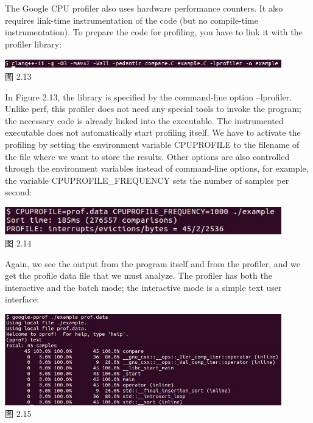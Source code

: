 
The Google CPU profiler also uses hardware performance counters. It also requires link-time instrumentation of the code (but no compile-time instrumentation). To prepare the code for profiling, you have to link it with the profiler library:

\begin{center}
\includegraphics[width=0.9\textwidth]{content/1/chapter2/images/13.jpg}\\
图 2.13
\end{center}

In Figure 2.13, the library is specified by the command-line option –lprofiler. Unlike perf, this profiler does not need any special tools to invoke the program; the necessary code is already linked into the executable. The instrumented executable does not automatically start profiling itself. We have to activate the profiling by setting the environment variable CPUPROFILE to the filename of the file where we want to store the results. Other options are also controlled through the environment variables instead of command-line options, for example, the variable CPUPROFILE\_FREQUENCY sets the number of samples per second:

\begin{center}
\includegraphics[width=0.9\textwidth]{content/1/chapter2/images/14.jpg}\\
图 2.14
\end{center}

Again, we see the output from the program itself and from the profiler, and we get the profile data file that we must analyze. The profiler has both the interactive and the batch mode; the interactive mode is a simple text user interface:

\begin{center}
\includegraphics[width=0.9\textwidth]{content/1/chapter2/images/15.jpg}\\
图 2.15
\end{center}

